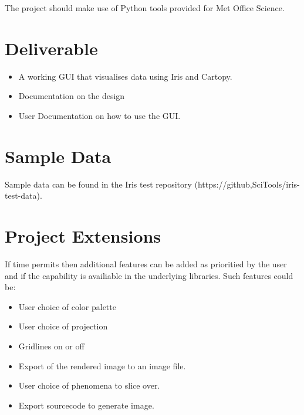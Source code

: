 \documentclass[whitecover]{MO_report}
\begin{document}
The project should make use of Python tools provided for Met Office Science.

\section{Deliverable}

\begin{itemize}

\item
A working GUI that visualises data using Iris and Cartopy.

\item
Documentation on the design

\item
User Documentation on how to use the GUI.

\end{itemize}

\section{Sample Data}

Sample data can be found in the Iris test repository
(https://github,SciTools/iris-test-data).

\section{Project Extensions}

If time permits then additional features can be added as prioritied by the user
and if the capability is availiable in the underlying libraries. Such features
could be:

\begin{itemize}

\item
User choice of color palette

\item
User choice of projection

\item
Gridlines on or off

\item
Export of the rendered image to an image file.

\item
User choice of phenomena to slice over.

\item
Export sourcecode to generate image.

\end{itemize}
\end{document}
